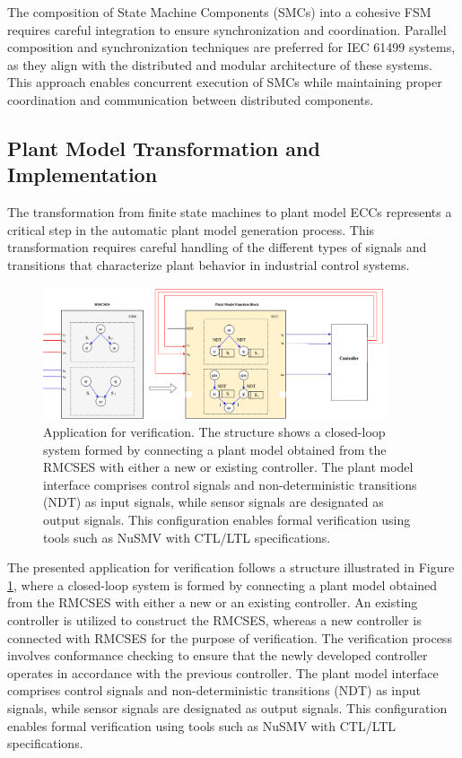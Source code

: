 The composition of State Machine Components (SMCs) into a cohesive FSM requires careful integration to ensure synchronization and coordination. Parallel composition and synchronization techniques are preferred for IEC 61499 systems, as they align with the distributed and modular architecture of these systems. This approach enables concurrent execution of SMCs while maintaining proper coordination and communication between distributed components.

\subsection{Plant Model Transformation and Implementation}

The transformation from finite state machines to plant model ECCs represents a critical step in the automatic plant model generation process. This transformation requires careful handling of the different types of signals and transitions that characterize plant behavior in industrial control systems.

\begin{figure}[!t]
	\centering
	\includegraphics[width=0.9\textwidth]{chapters/images/chapter4/VerificationApp1.png}
	\caption{Application for verification. The structure shows a closed-loop system formed by connecting a plant model obtained from the RMCSES with either a new or existing controller. The plant model interface comprises control signals and non-deterministic transitions (NDT) as input signals, while sensor signals are designated as output signals. This configuration enables formal verification using tools such as NuSMV with CTL/LTL specifications.}
	\label{verificationApp}
\end{figure}

The presented application for verification follows a structure illustrated in Figure \ref{verificationApp}, where a closed-loop system is formed by connecting a plant model obtained from the RMCSES with either a new or an existing controller. An existing controller is utilized to construct the RMCSES, whereas a new controller is connected with RMCSES for the purpose of verification. The verification process involves conformance checking to ensure that the newly developed controller operates in accordance with the previous controller. The plant model interface comprises control signals and non-deterministic transitions (NDT) as input signals, while sensor signals are designated as output signals. This configuration enables formal verification using tools such as NuSMV with CTL/LTL specifications.

